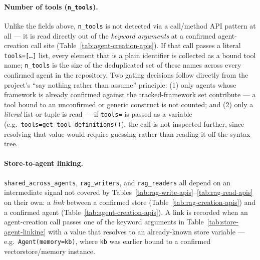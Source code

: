 \paragraph{Number of tools (\texttt{n\_tools}).}
Unlike the fields above, \texttt{n\_tools} is not detected via a call/method
API pattern at all --- it is read directly out of the \emph{keyword
arguments} at a confirmed agent-creation call site (Table~\ref{tab:agent-creation-apis}).
If that call passes a literal \texttt{tools=[\ldots]} list, every element
that is a plain identifier is collected as a bound tool name; \texttt{n\_tools}
is the size of the deduplicated set of these names across every confirmed
agent in the repository. Two gating decisions follow directly from the
project's ``say nothing rather than assume'' principle: (1) only agents whose
framework is already confirmed against the tracked-framework set contribute
--- a tool bound to an unconfirmed or generic construct is not counted; and
(2) only a \emph{literal} list or tuple is read --- if \texttt{tools=} is
passed as a variable (e.g.\ \texttt{tools=get\_tool\_definitions()}), the
call is not inspected further, since resolving that value would require
guessing rather than reading it off the syntax tree.


\paragraph{Store-to-agent linking.}
\texttt{shared\_across\_agents}, \texttt{rag\_writers}, and \texttt{rag\_readers}
all depend on an intermediate signal not covered by Tables~\ref{tab:rag-write-apis}--\ref{tab:rag-read-apis}
on their own: a \emph{link} between a confirmed store (Table~\ref{tab:rag-creation-apis})
and a confirmed agent (Table~\ref{tab:agent-creation-apis}). A link is
recorded when an agent-creation call passes one of the keyword arguments in
Table~\ref{tab:store-agent-linking} with a value that resolves to an
already-known store variable --- e.g.\ \texttt{Agent(memory=kb)}, where
\texttt{kb} was earlier bound to a confirmed vectorstore/memory instance.

